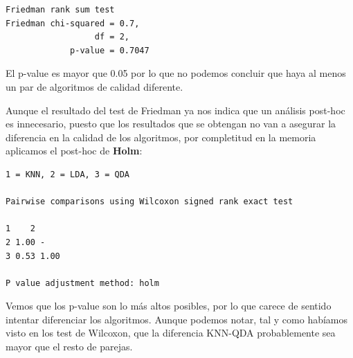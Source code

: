 \begin{verbatim}
Friedman rank sum test
Friedman chi-squared = 0.7, 
                  df = 2, 
             p-value = 0.7047
\end{verbatim}

El p-value es mayor que 0.05 por lo que no podemos concluir que haya al menos un par de algoritmos de calidad diferente.

\vspace{\baselineskip}
\vspace{\baselineskip}

Aunque el resultado del test de Friedman ya nos indica que un análisis post-hoc es innecesario, puesto que los resultados que se obtengan no van a asegurar la diferencia en la calidad de los algoritmos, por completitud en la memoria aplicamos el post-hoc de \textbf{Holm}:

\begin{verbatim}
1 = KNN, 2 = LDA, 3 = QDA

Pairwise comparisons using Wilcoxon signed rank exact test 

1    2   
2 1.00 -   
3 0.53 1.00
    
P value adjustment method: holm 
\end{verbatim}

Vemos que los p-value son lo más altos posibles, por lo que carece de sentido intentar diferenciar los algoritmos. Aunque podemos notar, tal y como habíamos visto en los test de Wilcoxon, que la diferencia KNN-QDA probablemente sea mayor que el resto de parejas.